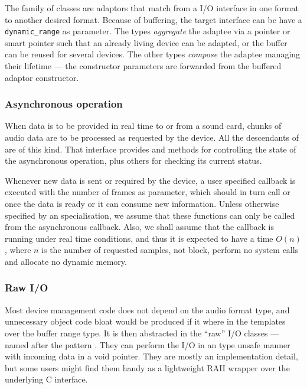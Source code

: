 The  family of classes are adaptors that match from
a I/O interface in one format to another desired format. Because of
buffering, the target interface can be have a \texttt{dynamic\_range}
as parameter. The  types \emph{aggregate} the
adaptee via a pointer or smart pointer such that an already living
device can be adapted, or the buffer can be reused for several
devices. The other types \emph{compose} the adaptee managing their
lifetime --- the constructor parameters are forwarded from the
buffered adaptor constructor.

\subsubsection{Asynchronous operation}

When data is to be provided in real time to or from a sound card,
chunks of audio data are to be processed as requested by the
device. All the descendants of  are of this
kind. That interface provides  and 
methods for controlling the state of the asynchronous
operation, plus others for checking its current status.

Whenever new data is sent or required by the device, a user specified
callback is executed with the number of frames as parameter, which
should in turn call  or  once the data is
ready or it can consume new information. Unless otherwise specified by
an specialisation, we assume that these functions can only be called
from the asynchronous callback. Also, we shall assume that the
callback is running under real time conditions, and thus it is
expected to have a time $O(n)$, where $n$ is the number of requested
samples, not block, perform no system calls and allocate no dynamic
memory.

\subsubsection{Raw I/O}

Most device management code does not depend on the audio format type,
and unnecessary object code bloat would be produced if it where in the
templates over the buffer range type. It is then abstracted in the
``raw'' I/O classes --- named after the pattern
. They can perform the I/O in an type
unsafe manner with incoming data in a void pointer. They are mostly an
implementation detail, but some users might find them handy as a
lightweight RAII wrapper over the underlying C interface.

